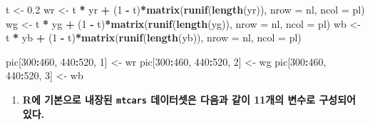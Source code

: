 \documentclass[
  11pt,
]{krantz}
\newenvironment{Shaded}{\begin{snugshade}}{\end{snugshade}}
\newcommand{\DataTypeTok}[1]{\textcolor[rgb]{0.27,0.27,0.27}{#1}}
\newcommand{\DecValTok}[1]{\textcolor[rgb]{0.06,0.06,0.06}{#1}}
\newcommand{\FloatTok}[1]{\textcolor[rgb]{0.06,0.06,0.06}{#1}}
\newcommand{\KeywordTok}[1]{\textcolor[rgb]{0.27,0.27,0.27}{\textbf{#1}}}
\newcommand{\NormalTok}[1]{#1}
\newcommand{\OperatorTok}[1]{\textcolor[rgb]{0.43,0.43,0.43}{\textbf{#1}}}
\newcommand{\StringTok}[1]{\textcolor[rgb]{0.5,0.5,0.5}{#1}}
\providecommand{\tightlist}{%
  \setlength{\itemsep}{0pt}\setlength{\parskip}{0pt}}
\begin{document}
\begin{Shaded}
\begin{Highlighting}[]
\NormalTok{t <-}\StringTok{ }\FloatTok{0.2}
\NormalTok{wr <-}\StringTok{ }\NormalTok{t }\OperatorTok{*}\StringTok{ }\NormalTok{yr }\OperatorTok{+}\StringTok{ }\NormalTok{(}\DecValTok{1} \OperatorTok{-}\StringTok{ }\NormalTok{t)}\OperatorTok{*}\KeywordTok{matrix}\NormalTok{(}\KeywordTok{runif}\NormalTok{(}\KeywordTok{length}\NormalTok{(yr)), }\DataTypeTok{nrow =}\NormalTok{ nl, }\DataTypeTok{ncol =}\NormalTok{ pl)}
\NormalTok{wg <-}\StringTok{ }\NormalTok{t }\OperatorTok{*}\StringTok{ }\NormalTok{yg }\OperatorTok{+}\StringTok{ }\NormalTok{(}\DecValTok{1} \OperatorTok{-}\StringTok{ }\NormalTok{t)}\OperatorTok{*}\KeywordTok{matrix}\NormalTok{(}\KeywordTok{runif}\NormalTok{(}\KeywordTok{length}\NormalTok{(yg)), }\DataTypeTok{nrow =}\NormalTok{ nl, }\DataTypeTok{ncol =}\NormalTok{ pl)}
\NormalTok{wb <-}\StringTok{ }\NormalTok{t }\OperatorTok{*}\StringTok{ }\NormalTok{yb }\OperatorTok{+}\StringTok{ }\NormalTok{(}\DecValTok{1} \OperatorTok{-}\StringTok{ }\NormalTok{t)}\OperatorTok{*}\KeywordTok{matrix}\NormalTok{(}\KeywordTok{runif}\NormalTok{(}\KeywordTok{length}\NormalTok{(yb)), }\DataTypeTok{nrow =}\NormalTok{ nl, }\DataTypeTok{ncol =}\NormalTok{ pl)}


\NormalTok{pic[}\DecValTok{300}\OperatorTok{:}\DecValTok{460}\NormalTok{, }\DecValTok{440}\OperatorTok{:}\DecValTok{520}\NormalTok{, }\DecValTok{1}\NormalTok{] <-}\StringTok{ }\NormalTok{wr}
\NormalTok{pic[}\DecValTok{300}\OperatorTok{:}\DecValTok{460}\NormalTok{, }\DecValTok{440}\OperatorTok{:}\DecValTok{520}\NormalTok{, }\DecValTok{2}\NormalTok{] <-}\StringTok{ }\NormalTok{wg}
\NormalTok{pic[}\DecValTok{300}\OperatorTok{:}\DecValTok{460}\NormalTok{, }\DecValTok{440}\OperatorTok{:}\DecValTok{520}\NormalTok{, }\DecValTok{3}\NormalTok{] <-}\StringTok{ }\NormalTok{wb}
\end{Highlighting}
\end{Shaded}

\normalsize

\begin{enumerate}
\def\labelenumi{\arabic{enumi}.}
\setcounter{enumi}{1}
\tightlist
\item
  \textbf{R에 기본으로 내장된 \texttt{mtcars} 데이터셋은 다음과 같이 11개의 변수로 구성되어 있다. }
\end{enumerate}

\footnotesize
\end{document}
